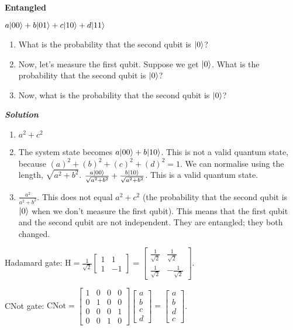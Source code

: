 \begin{example}
    \textbf{Entangled}

    $a\lvert00\rangle + b\lvert01\rangle + c\lvert10\rangle + d\lvert11\rangle$\\
    \begin{enumerate}
        \item What is the probability that the second qubit is $\lvert0\rangle$?
        \item Now, let's measure the first qubit. Suppose we get $\lvert0\rangle$. What is the probability that the second qubit is $\lvert0\rangle$?
        \item Now, what is the probability that the second qubit is $\lvert0\rangle$?
    \end{enumerate}
    \textbf{\emph{Solution}}
    \begin{enumerate}
        \item $a^2 + c^2$
        \item The system state becomes $a\lvert00\rangle + b\lvert10\rangle$. This is not a valid quantum state, because $(a)^2 + (b)^2 + (c)^2 + (d)^2 = 1$. We can normalise using the length, $\sqrt{a^2 + b^2}$. $\frac{a\lvert00\rangle}{\sqrt{a^2 + b^2}} + \frac{b\lvert10\rangle}{\sqrt{a^2 + b^2}}$. This is a valid quantum state.
        \item $\frac{a^2}{a^2 + b^2}$. This does not equal $a^2 + c^2$ (the probability that the second qubit is $\lvert0\rangle$ when we don't measure the first qubit). This means that the first qubit and the second qubit are not independent. They are entangled; they both changed.
    \end{enumerate}
\end{example}

Hadamard gate: $\mathrm{H} = \frac{1}{\sqrt{2}}\begin{bmatrix}
    1 & 1\\
    1 & -1
\end{bmatrix} = \begin{bmatrix}
    \frac{1}{\sqrt{2}} & \frac{1}{\sqrt{2}}\\
    \frac{1}{\sqrt{2}} & -\frac{1}{\sqrt{2}}
\end{bmatrix}$.

CNot gate: $\mathrm{CNot} = \begin{bmatrix}
    1 & 0 & 0 & 0\\
    0 & 1 & 0 & 0\\
    0 & 0 & 0 & 1\\
    0 & 0 & 1 & 0
\end{bmatrix} \begin{bmatrix}
    a\\
    b\\
    c\\
    d
\end{bmatrix} = \begin{bmatrix}
    a\\
    b\\
    d\\
    c
\end{bmatrix}$.


